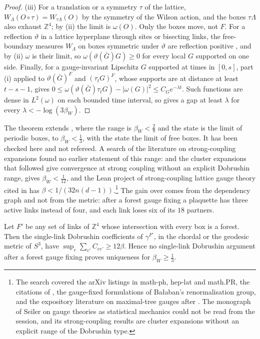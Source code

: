 \begin{proof}
(iii) For a translation or a symmetry $\tau$ of the lattice, $W_{\Lambda}(O\circ\tau)=W_{\tau\Lambda}(O)$ by the symmetry of the Wilson action, and the boxes $\tau\Lambda$ also exhaust $\mathbb{Z}^{4}$; by (ii) the limit is $\omega(O)$. Only the boxes move, not $F$. For a reflection $\vartheta$ in a lattice hyperplane through sites or bisecting links, the free-boundary measures $W_{\Lambda}$ on boxes symmetric under $\vartheta$ are reflection positive \cite{OSei78}, and by (ii) $\omega$ is their limit, so $\omega(\vartheta(\bar G)G)\ge0$ for every local $G$ supported on one side. Finally, for a gauge-invariant Lipschitz $G$ supported at times in $[0,s]$, part (i) applied to $\vartheta(\bar G)^{F}$ and $(\tau_{t}G)^{F}$, whose supports are at distance at least $t-s-1$, gives $0\le\omega(\vartheta(\bar G)\tau_{t}G)-|\omega(G)|^{2}\le C_{G}e^{-\lambda t}$. Such functions are dense in $L^{2}(\omega)$ on each bounded time interval, so \cite[Proposition~gapdecay]{BB26d} gives a gap at least $\lambda$ for every $\lambda<-\log(3\beta_{W})$.
\end{proof}

The theorem extends \cite[Theorem~F]{BB26d}, where the range is $\beta_{W}<\frac29$ and the state is the limit of periodic boxes, to $\beta_{W}<\frac13$, with the state the limit of free boxes. It has been checked here and not refereed. A search of the literature on strong-coupling expansions found no earlier statement of this range: \cite{OSei78} and the cluster expansions that followed give convergence at strong coupling without an explicit Dobrushin range, \cite{SZZ23} gives $\beta_{W}<\frac1{12}$, and the Lean project of strong-coupling lattice gauge theory cited in \cite{BB26d} has $\beta<1/(32n(d-1))$.\footnote{The search covered the arXiv listings in math-ph, hep-lat and math.PR, the citations of \cite{SZZ23}, the gauge-fixed formulations of Ba{\l}aban's renormalisation group, and the expository literature on maximal-tree gauges after \cite{Cre77}. The monograph of Seiler on gauge theories as statistical mechanics could not be read from the session, and its strong-coupling results are cluster expansions without an explicit range of the Dobrushin type.} The gain over \cite{BB26d} comes from the dependency graph and not from the metric: after a forest gauge fixing a plaquette has three active links instead of four, and each link loses six of its $18$ partners.

\begin{proposition}\label{prop:forestceiling}
Let $F'$ be any set of links of $\mathbb{Z}^{4}$ whose intersection with every box is a forest. Then the single-link Dobrushin coefficients of $\gamma^{F'}$, in the chordal or the geodesic metric of $S^{3}$, have $\sup_{e}\sum_{e'}C_{ee'}\ge12\beta$. Hence no single-link Dobrushin argument after a forest gauge fixing proves uniqueness for $\beta_{W}\ge\frac13$.
\end{proposition}

